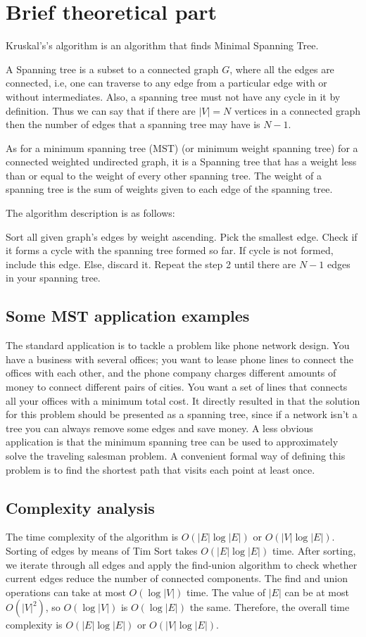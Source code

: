 \documentclass[12pt, bachelor, substylefile = algo_title.rtx]{disser}
\theoremstyle{definition}
\begin{document}
\section{Brief theoretical part}
Kruskal's's algorithm is an algorithm that finds Minimal Spanning Tree. 

A Spanning tree is a subset to a connected graph $G$, where all the edges are connected, i.e, one can traverse to any edge from a particular edge with or without intermediates. Also, a spanning tree must not have any cycle in it by definition. Thus we can say that if there are $|V| = N$ vertices in a connected graph then the number of edges that a spanning tree may have is $N-1$.

As for a minimum spanning tree (MST) (or minimum weight spanning tree) for a connected weighted undirected graph, it is a Spanning tree that has a weight less than or equal to the weight of every other spanning tree. The weight of a spanning tree is the sum of weights given to each edge of the spanning tree.

The algorithm description is as follows:
\begin{outline}[enumerate]
\1 Sort all given graph's edges by weight ascending.
\1 Pick the smallest edge. Check if it forms a cycle with the spanning tree formed so far. If cycle is not formed, include this edge. Else, discard it. 
\1 Repeat the step 2 until there are $N-1$ edges in your spanning tree.
\end{outline}

\subsection{Some MST application examples}
The standard application is to tackle a problem like phone network design. You have a business with several offices; you want to lease phone lines to connect the offices with each other, and the phone company charges different amounts of money to connect different pairs of cities. You want a set of lines that connects all your offices with a minimum total cost. It directly resulted in that the solution for this problem should be presented as a spanning tree, since if a network isn’t a tree you can always remove some edges and save money. A less obvious application is that the minimum spanning tree can be used to approximately solve the traveling salesman problem. A convenient formal way of defining this problem is to find the shortest path that visits each point at least once. 

\subsection{Complexity analysis}
The time complexity of the algorithm is $O(|E| \log |E|)$ or $O(|V| \log |E|)$. Sorting of edges by means of Tim Sort takes $O(|E| \log |E|)$ time. After sorting, we iterate through all edges and apply the find-union algorithm to check whether current edges reduce the number of connected components. The find and union operations can take at most $O(\log |V|)$ time. The value of $|E|$ can be at most $O(|V|^2)$, so $O(\log |V|)$ is $O(\log |E|)$ the same. Therefore, the overall time complexity is $O(|E| \log |E|)$ or $O(|V| \log |E|)$.
\end{document}
